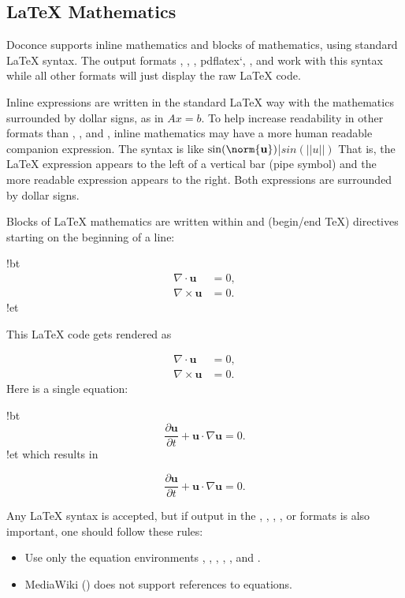 \documentclass[%
oneside,                 %
final,                   %
10pt]{article}
\begin{document}
\noindent
\subsection{{\LaTeX} Mathematics}

Doconce supports inline mathematics and blocks of mathematics, using
standard {\LaTeX} syntax. The output formats , , ,
pdflatex`, , and  work with this syntax while all other
formats will just display the raw {\LaTeX} code.

Inline expressions are written in the standard
{\LaTeX} way with the mathematics surrounded by dollar signs, as in
$Ax=b$. To help increase readability in other formats than ,
, and , inline mathematics may have a more human
readable companion expression. The syntax is like
\bccq
$\sin(\norm{\bf u})$|$sin(||u||)$
\eccq
That is, the {\LaTeX} expression appears to the left of a vertical bar (pipe
symbol) and the more readable expression appears to the right. Both
expressions are surrounded by dollar signs.

Blocks of {\LaTeX} mathematics are written within
and
 (begin/end TeX) directives starting on the beginning of a line:

\bccq
!bt
\begin{align*}
\nabla\cdot \pmb{u} &= 0,\\ 
\nabla\times \pmb{u} &= 0.
\end{align*}
!et
\eccq

This {\LaTeX} code gets rendered as

\begin{align*}
\nabla\cdot \pmb{u} &= 0,\\ 
\nabla\times \pmb{u} &= 0.
\end{align*}
Here is a single equation:

\bccq
!bt
\[ \frac{\partial\pmb{u}}{\partial t} + \pmb{u}\cdot\nabla\pmb{u} = 0.\]
!et
\eccq
which results in

\[ \frac{\partial\pmb{u}}{\partial t} + \pmb{u}\cdot\nabla\pmb{u} = 0.\]

Any {\LaTeX} syntax is accepted, but if output in the , ,
, , or  formats
is also important, one should follow these rules:

\begin{itemize}
  \item Use only the equation environments \code{\[}, \code{\]},
    , , , and .

  \item MediaWiki () does not support references to equations.
\end{itemize}
\end{document}
